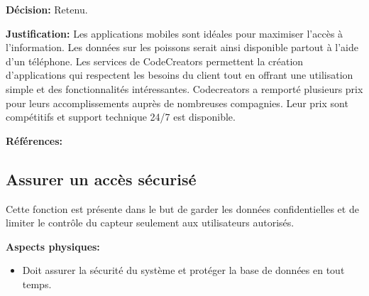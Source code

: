 \textbf{Décision:} Retenu.

\textbf{Justification:} Les applications mobiles sont idéales pour maximiser l'accès à l'information. Les données sur les poissons serait ainsi disponible partout à l'aide d'un téléphone. Les services de CodeCreators permettent la création d'applications qui respectent les besoins du client tout en offrant une utilisation simple et des fonctionnalités intéressantes. Codecreators a remporté plusieurs prix pour leurs accomplissements auprès de nombreuses compagnies. Leur prix sont compétitifs et support technique 24/7 est disponible.

\textbf{Références:} \cite{CodeCreators} \cite{CodeCreators2}

\begin{table}[!htb]
\footnotesize
\centering
{}
\caption{Faisabilité des concepts pour la fonction afficher les données}
\label{t:Decision_affichage}
\end{table}


\subsection{Assurer un accès sécurisé}
Cette fonction est présente dans le but de garder les données confidentielles et de limiter le contrôle du capteur seulement aux utilisateurs autorisés.

\textbf{Aspects physiques:}
\begin{itemize}[label = {--}]
    \item Doit assurer la sécurité du système et protéger la base de données en tout temps.
\end{itemize}


